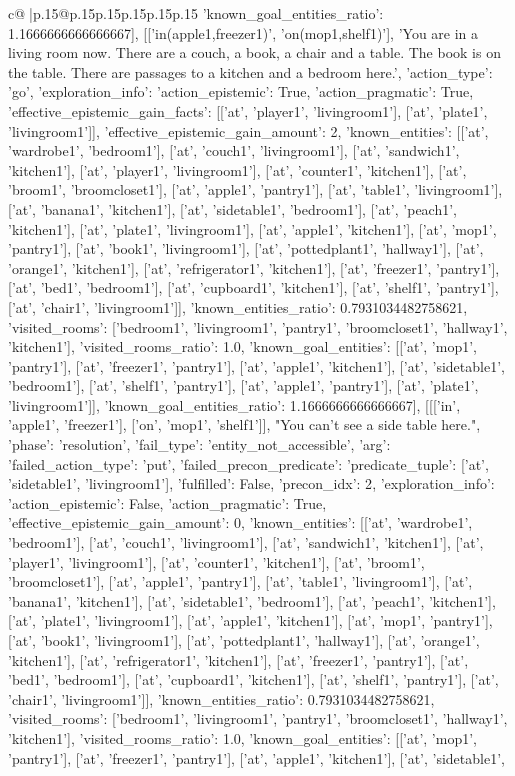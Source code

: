\documentclass{article}
\begin{document}
{\begin{supertabular}{c@{$\;$}|p{.15\linewidth}@{}p{.15\linewidth}p{.15\linewidth}p{.15\linewidth}p{.15\linewidth}p{.15\linewidth}}
{{{'known_goal_entities_ratio': 1.1666666666666667}}], [['in(apple1,freezer1)', 'on(mop1,shelf1)'], 'You are in a living room now. There are a couch, a book, a chair and a table. The book is on the table. There are passages to a kitchen and a bedroom here.', {'action_type': 'go', 'exploration_info': {'action_epistemic': True, 'action_pragmatic': True, 'effective_epistemic_gain_facts': [['at', 'player1', 'livingroom1'], ['at', 'plate1', 'livingroom1']], 'effective_epistemic_gain_amount': 2, 'known_entities': [['at', 'wardrobe1', 'bedroom1'], ['at', 'couch1', 'livingroom1'], ['at', 'sandwich1', 'kitchen1'], ['at', 'player1', 'livingroom1'], ['at', 'counter1', 'kitchen1'], ['at', 'broom1', 'broomcloset1'], ['at', 'apple1', 'pantry1'], ['at', 'table1', 'livingroom1'], ['at', 'banana1', 'kitchen1'], ['at', 'sidetable1', 'bedroom1'], ['at', 'peach1', 'kitchen1'], ['at', 'plate1', 'livingroom1'], ['at', 'apple1', 'kitchen1'], ['at', 'mop1', 'pantry1'], ['at', 'book1', 'livingroom1'], ['at', 'pottedplant1', 'hallway1'], ['at', 'orange1', 'kitchen1'], ['at', 'refrigerator1', 'kitchen1'], ['at', 'freezer1', 'pantry1'], ['at', 'bed1', 'bedroom1'], ['at', 'cupboard1', 'kitchen1'], ['at', 'shelf1', 'pantry1'], ['at', 'chair1', 'livingroom1']], 'known_entities_ratio': 0.7931034482758621, 'visited_rooms': ['bedroom1', 'livingroom1', 'pantry1', 'broomcloset1', 'hallway1', 'kitchen1'], 'visited_rooms_ratio': 1.0, 'known_goal_entities': [['at', 'mop1', 'pantry1'], ['at', 'freezer1', 'pantry1'], ['at', 'apple1', 'kitchen1'], ['at', 'sidetable1', 'bedroom1'], ['at', 'shelf1', 'pantry1'], ['at', 'apple1', 'pantry1'], ['at', 'plate1', 'livingroom1']], 'known_goal_entities_ratio': 1.1666666666666667}}], [[['in', 'apple1', 'freezer1'], ['on', 'mop1', 'shelf1']], "You can't see a side table here.", {'phase': 'resolution', 'fail_type': 'entity_not_accessible', 'arg': {'failed_action_type': 'put', 'failed_precon_predicate': {'predicate_tuple': ['at', 'sidetable1', 'livingroom1'], 'fulfilled': False, 'precon_idx': 2}}, 'exploration_info': {'action_epistemic': False, 'action_pragmatic': True, 'effective_epistemic_gain_amount': 0, 'known_entities': [['at', 'wardrobe1', 'bedroom1'], ['at', 'couch1', 'livingroom1'], ['at', 'sandwich1', 'kitchen1'], ['at', 'player1', 'livingroom1'], ['at', 'counter1', 'kitchen1'], ['at', 'broom1', 'broomcloset1'], ['at', 'apple1', 'pantry1'], ['at', 'table1', 'livingroom1'], ['at', 'banana1', 'kitchen1'], ['at', 'sidetable1', 'bedroom1'], ['at', 'peach1', 'kitchen1'], ['at', 'plate1', 'livingroom1'], ['at', 'apple1', 'kitchen1'], ['at', 'mop1', 'pantry1'], ['at', 'book1', 'livingroom1'], ['at', 'pottedplant1', 'hallway1'], ['at', 'orange1', 'kitchen1'], ['at', 'refrigerator1', 'kitchen1'], ['at', 'freezer1', 'pantry1'], ['at', 'bed1', 'bedroom1'], ['at', 'cupboard1', 'kitchen1'], ['at', 'shelf1', 'pantry1'], ['at', 'chair1', 'livingroom1']], 'known_entities_ratio': 0.7931034482758621, 'visited_rooms': ['bedroom1', 'livingroom1', 'pantry1', 'broomcloset1', 'hallway1', 'kitchen1'], 'visited_rooms_ratio': 1.0, 'known_goal_entities': [['at', 'mop1', 'pantry1'], ['at', 'freezer1', 'pantry1'], ['at', 'apple1', 'kitchen1'], ['at', 'sidetable1', }}}
\end{supertabular}}
\end{document}
